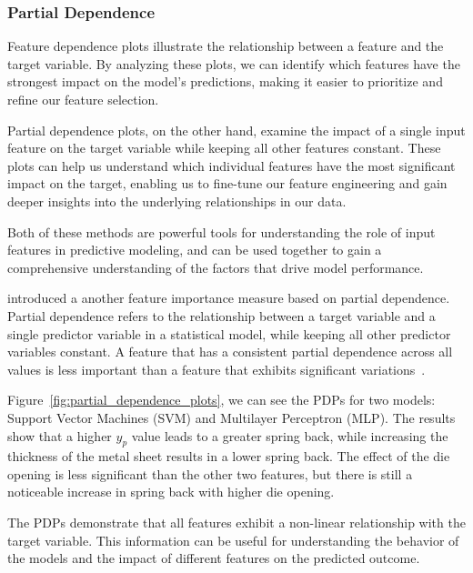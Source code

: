 \subsubsection{Partial Dependence}
Feature dependence plots illustrate the relationship between a feature and the target variable.
By analyzing these plots, we can identify which features have the strongest impact on the model's
predictions, making it easier to prioritize and refine our feature selection.

Partial dependence plots, on the other hand, examine the impact of a single input feature on the
target variable while keeping all other features constant.
These plots can help us understand which individual features have the most significant impact on
the target, enabling us to fine-tune our feature engineering and gain deeper insights into the
underlying relationships in our data.

Both of these methods are powerful tools for understanding the role of input features in
predictive modeling, and can be used together to gain a comprehensive understanding of the
factors that drive model performance.

\cite{greenwell2018simple} introduced a another feature importance measure based on partial
dependence.
Partial dependence refers to the relationship between a target variable and a single predictor
variable in a statistical model, while keeping all other predictor variables constant.
A feature that has a consistent partial dependence across all values is less important than a
feature that exhibits significant variations~\cite[p. 117--118]{molnar2020interpretable}.


Figure~\ref{fig:partial_dependence_plots}, we can see the PDPs for two models: Support Vector
Machines (SVM) and Multilayer Perceptron (MLP).
The results show that a higher \(y_p\) value leads to a greater spring back, while increasing the
thickness of the metal sheet results in a lower spring back.
The effect of the die opening is less significant than the other two features, but there is still
a noticeable increase in spring
back with higher die opening.

The PDPs demonstrate that all features exhibit a non-linear relationship with the target variable.
This information can be useful for understanding the behavior of the models and the impact of
different features on the predicted outcome.


